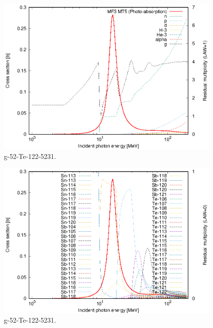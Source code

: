 \begin{figure}
 \includegraphics[width=\linewidth]{eps/g_52-Te-122_5231.eps}
  \caption{g-52-Te-122-5231.}
\end{figure}
\begin{figure}
 \includegraphics[width=\linewidth]{eps-law0/g_52-Te-122_5231.eps}
 \caption{g-52-Te-122-5231.}
\end{figure}
\newpage \clearpage

